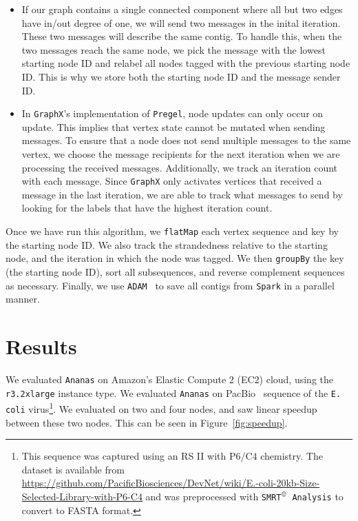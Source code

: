 \documentclass[11pt]{article}
\theoremstyle{plain}
\begin{document}
\begin{itemize}
\item If our graph contains a single connected component where all but two edges have in/out degree
of one, we will send two messages in the inital iteration. These two messages will describe
the same contig. To handle this, when the two messages reach the same node, we pick the message
with the lowest starting node ID and relabel all nodes tagged with the previous starting node
ID. This is why we store both the starting node ID and the message sender ID.
\item In \texttt{GraphX}'s implementation of \texttt{Pregel}, node updates can only occur on update.
This implies that vertex state cannot be mutated when sending messages. To ensure that a node does
not send multiple messages to the same vertex, we choose the message recipients for the next
iteration when we are processing the received messages. Additionally, we track an iteration
count with each message. Since \texttt{GraphX} only activates vertices that received a message in
the last iteration, we are able to track what messages to send by looking for the labels that
have the highest iteration count.
\end{itemize}

Once we have run this algorithm, we \texttt{flatMap} each vertex sequence and key by the starting
node ID. We also track the strandedness relative to the starting node, and the iteration in which
the node was tagged. We then \texttt{groupBy} the key (the starting node ID), sort all subsequences,
and reverse complement sequences as necessary. Finally, we use \texttt{ADAM}~\cite{massie13, nothaft15}
to save all contigs from \texttt{Spark} in a parallel manner.

\section{Results}
\label{sec:results}

We evaluated \texttt{Ananas} on Amazon's Elastic Compute 2 (EC2) cloud, using the \texttt{r3.2xlarge}
instance type. We evaluated \texttt{Ananas} on PacBio~\cite{eid09} sequence of the \texttt{E. coli}
virus\footnote{This sequence was captured using an RS II  with P6/C4 chemistry. The dataset is available
from \url{https://github.com/PacificBiosciences/DevNet/wiki/E.-coli-20kb-Size-Selected-Library-with-P6-C4}
and was preprocessed with \texttt{SMRT$^\copyright$ Analysis} to convert to FASTA format.}. We evaluated
on two and four nodes, and saw linear speedup between these two nodes. This can be seen in
Figure~\ref{fig:speedup}.
\end{document}

